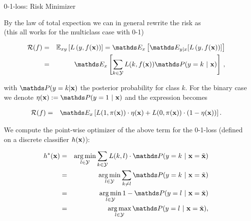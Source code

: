 \documentclass[11pt,compress,t,notes=noshow, xcolor=table]{beamer}
\begin{document}
\begin{vbframe}{0-1-loss: Risk Minimizer}

By the law of total expection we can in general rewrite the risk as\\
(this all works for the multiclass case with 0-1)

\vspace*{-0.5cm}

\begin{eqnarray*}
  \riskf  & = & \Exy\left[\Lxy\right] = \E_x \left[ \E_{y|x} [ \Lxy ] \right] \\
          & = & \E_x \left[\sum_{k \in \Yspace} L(k, \fx) \P(y = k~|~ \xv)\right]\,, 
\end{eqnarray*}

with $\P(y = k| \xv)$ the posterior probability for class $k$. For the binary case we denote $\eta(\xv) := \P(y = 1 ~|~ \xv)$ and the expression becomes 

\vspace*{-0.3cm}


\begin{eqnarray*}
  \riskf &=& \E_x \left[L(1, \pix) \cdot \eta(\xv) + L(0, \pix) \cdot (1 - \eta(\xv)) \right]. 
\end{eqnarray*}







\framebreak 

We compute the point-wise optimizer of the above term for the 0-1-loss (defined on a discrete classifier $h(\mathbf{x})$): 

  \begin{eqnarray*}  
  \hxbayes &=& \argmin_{l \in \Yspace} \sum_{k \in \Yspace} L(k, l) \cdot \P(y = k~|~\xv = \xtil) \\
  &=& \argmin_{l \in \Yspace} \sum_{k \ne l} \P(y = k~|~\xv = \xtil) \\ 
  &=& \argmin_{l \in \Yspace} 1 - \P(y = l~|~\xv = \xtil) \\
  &=& \argmax_{l \in \Yspace} \P(y = l~|~ \xv = \xtil),
  \end{eqnarray*}


\end{vbframe}
\end{document}
